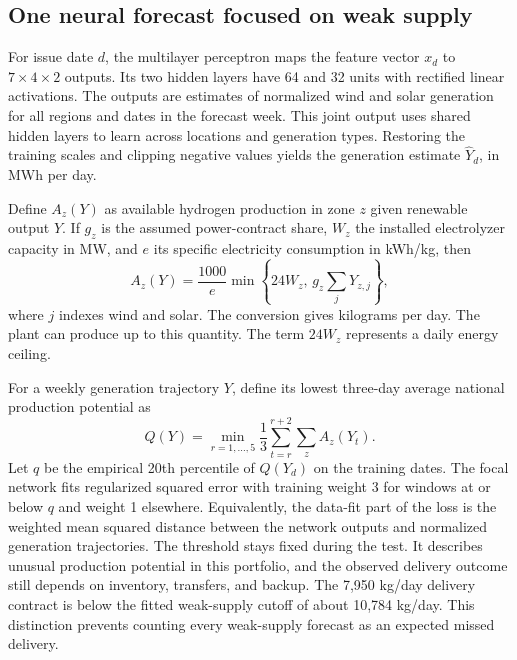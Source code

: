 \subsection{One neural forecast focused on weak supply}
\label{sec:neural}
For issue date $d$, the multilayer perceptron maps the feature vector $x_d$ to $7\times4\times2$ outputs. Its two hidden layers have 64 and 32 units with rectified linear activations. The outputs are estimates of normalized wind and solar generation for all regions and dates in the forecast week. This joint output uses shared hidden layers to learn across locations and generation types. Restoring the training scales and clipping negative values yields the generation estimate $\widehat Y_d$, in MWh per day.

Define $A_z(Y)$ as available hydrogen production in zone $z$ given renewable output $Y$. If $g_z$ is the assumed power-contract share, $W_z$ the installed electrolyzer capacity in MW, and $e$ its specific electricity consumption in kWh/kg, then
\begin{equation}
\label{eq:available}
A_z(Y)=\frac{1000}{e}\min\!\left\{24W_z,\,g_z\sum_jY_{z,j}\right\},
\end{equation}
where $j$ indexes wind and solar. The conversion gives kilograms per day. The plant can produce up to this quantity. The term $24W_z$ represents a daily energy ceiling.

For a weekly generation trajectory $Y$, define its lowest three-day average national production potential as
\begin{equation}
\label{eq:weak}
Q(Y)=\min_{r=1,\ldots,5}\frac{1}{3}
       \sum_{t=r}^{r+2}\sum_z A_z(Y_t).
\end{equation}
Let $q$ be the empirical 20th percentile of $Q(Y_d)$ on the training dates. The focal network fits regularized squared error with training weight 3 for windows at or below $q$ and weight 1 elsewhere. Equivalently, the data-fit part of the loss is the weighted mean squared distance between the network outputs and normalized generation trajectories. The threshold stays fixed during the test. It describes unusual production potential in this portfolio, and the observed delivery outcome still depends on inventory, transfers, and backup. The 7{,}950 kg/day delivery contract is below the fitted weak-supply cutoff of about 10{,}784 kg/day. This distinction prevents counting every weak-supply forecast as an expected missed delivery.

